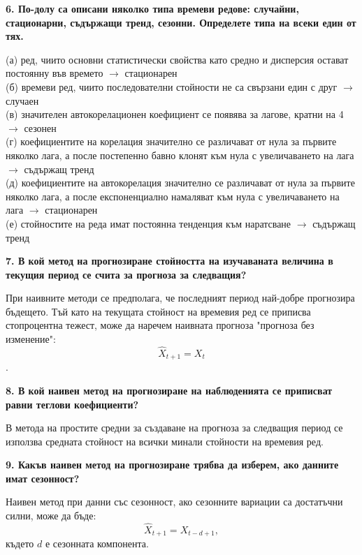 \documentclass{article}
\begin{document}
\begin{flushleft}
\textbf{6. По-долу са описани няколко типа времеви редове: случайни, стационарни, съдържащи тренд, сезонни. Определете типа на всеки един от тях.}
\begin{flushleft}
(а) ред, чиито основни статистически свойства като средно и дисперсия остават постоянну във времето $\rightarrow$ стационарен \\
(б) времеви ред, чиито последователни стойности не са свързани един с друг $\rightarrow$ случаен \\
(в) значителен автокорелационен коефициент се появява за лагове, кратни на 4 $\rightarrow$ сезонен \\
(г) коефициентите на корелация значително се различават от нула за първите няколко лага, а после постепенно бавно клонят към нула с увеличаването на лага $\rightarrow$ съдържащ тренд \\
(д) коефициентите на автокорелация значително се различават от нула за първите няколко лага, а после експоненциално намаляват към нула с увеличаването на лага $\rightarrow$ стационарен \\
(е) стойностите на реда имат постоянна тенденция към наратсване $\rightarrow$ съдържащ тренд
\end{flushleft}

\textbf{7. В кой метод на прогнозиране стойността на изучаваната величина в текущия период се счита за прогноза за следващия?}
\begin{flushleft}
При наивните методи се предполага, че последният период най-добре прогнозира бъдещето. Тъй като на текущата стойност на времевия ред се приписва стопроцентна тежест, може да наречем наивната прогноза "прогноза без изменение": $$\widehat{X}_{t+1} = X_t$$.
\end{flushleft}

\textbf{8. В кой наивен метод на прогнозиране на наблюденията се приписват равни теглови коефициенти?}
\begin{flushleft}
В метода на простите средни за създаване на прогноза за следващия период се използва средната стойност на всички минали стойности на времевия ред. 
\end{flushleft}

\textbf{9. Какъв наивен метод на прогнозиране трябва да изберем, ако данните имат сезонност?}
\begin{flushleft}
Наивен метод при данни със сезонност, ако сезонните вариации са достатъчни силни, може да бъде: $$\widehat{X}_{t+1} = X_{t-d+1},$$ където $d$ е сезонната компонента.
\end{flushleft}

\end{flushleft}
\end{document}
